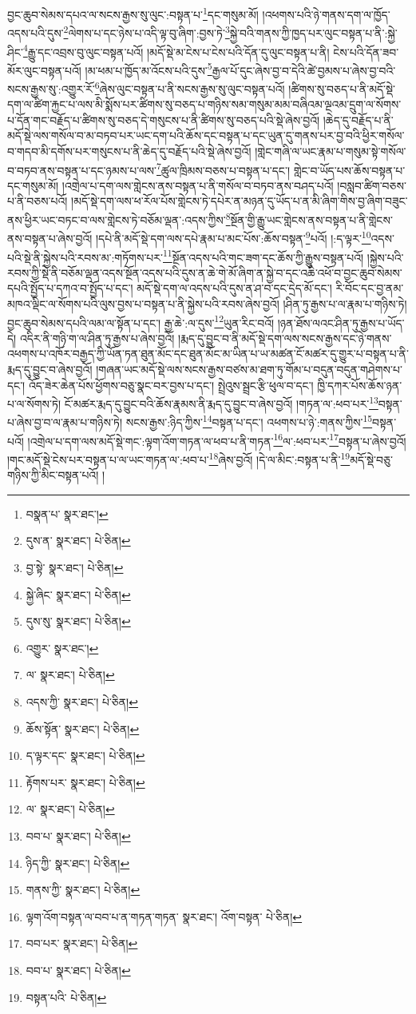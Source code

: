 བྱང་ཆུབ་སེམས་དཔའ་ལ་སངས་རྒྱས་སུ་ལུང་:བསྟན་པ་\footnote{བསྣན་པ་  སྣར་ཐང་། }དང་གསུམ་མོ། །འཕགས་པའི་ཉེ་གནས་དག་ལ་ཁྱོད་འདས་པའི་དུས་\footnote{དུས་ན་  སྣར་ཐང་།  པེ་ཅིན། }ལེགས་པ་དང་ཉེས་པ་འདི་ལྟ་བུ་ཞིག་:བྱས་ཏེ་\footnote{བྱ་སྟེ་  སྣར་ཐང་།  པེ་ཅིན། }སྐྱེ་བའི་གནས་ཀྱི་ཁྱད་པར་ལུང་བསྟན་པ་ནི་:སྐྱེ་ཤིང་\footnote{སྐྱེ་ཞིང་  སྣར་ཐང་།  པེ་ཅིན། }རྒྱུ་དང་འབྲས་བུ་ལུང་བསྟན་པའོ། །མདོ་སྡེ་མ་ངེས་པ་ངེས་པའི་དོན་དུ་ལུང་བསྟན་པ་ནི། ངེས་པའི་དོན་ཟབ་མོར་ལུང་བསྟན་པའོ། །མ་ཕམ་པ་ཁྱོད་མ་འོངས་པའི་དུས་\footnote{དུས་སུ་  སྣར་ཐང་།  པེ་ཅིན། }རྒྱལ་པོ་དུང་ཞེས་བྱ་བ་དེའི་ཚེ་བྱམས་པ་ཞེས་བྱ་བའི་སངས་རྒྱས་སུ་:འགྱུར་རོ་\footnote{འགྱུར་  སྣར་ཐང་། }ཞེས་ལུང་བསྟན་པ་ནི་སངས་རྒྱས་སུ་ལུང་བསྟན་པའོ། །ཚིགས་སུ་བཅད་པ་ནི་མདོ་སྡེ་དག་ལ་ཚིག་རྐྱང་པ་ལས་མི་སྨོས་པར་ཚིགས་སུ་བཅད་པ་གཉིས་སམ་གསུམ་མམ་བཞིའམ་ལྔའམ་དྲུག་ལ་སོགས་པ་དོན་གང་བརྗོད་པ་ཚིགས་སུ་བཅད་དེ་གསུངས་པ་ནི་ཚིགས་སུ་བཅད་པའི་སྡེ་ཞེས་བྱའོ། །ཆེད་དུ་བརྗོད་པ་ནི་མདོ་སྡེ་ལས་གསོལ་བ་མ་བཏབ་པར་ཡང་དག་པའི་ཆོས་དང་བསྟན་པ་དང་ཡུན་དུ་གནས་པར་བྱ་བའི་ཕྱིར་གསོལ་བ་གདབ་མི་དགོས་པར་གསུངས་པ་ནི་ཆེད་དུ་བརྗོད་པའི་སྡེ་ཞེས་བྱའོ། །གླེང་གཞི་ལ་ཡང་རྣམ་པ་གསུམ་སྟེ་གསོལ་བ་བཏབ་ནས་བསྟན་པ་དང་ཉམས་པ་ལས་\footnote{ལ་  སྣར་ཐང་།  པེ་ཅིན། }ཚུལ་ཁྲིམས་བཅས་པ་བསྟན་པ་དང་། གླེང་བ་ཡོད་པས་ཆོས་བསྟན་པ་དང་གསུམ་མོ། །འགྲེལ་པ་དག་ལས་གླེངས་ནས་བསྟན་པ་ནི་གསོལ་བ་བཏབ་ནས་བཤད་པའོ། །བསླབ་ཚིག་བཅས་པ་ནི་བཅས་པའོ། །མདོ་སྡེ་དག་ལས་ཕ་རོལ་པོས་གླེངས་ཏེ་དཔེར་ན་མཉན་དུ་ཡོད་པ་ན་མི་ཞིག་གིས་བྱ་ཞིག་བཟུང་ནས་ཕྱིར་ཡང་བཏང་བ་ལས་གླེངས་ཏེ་བཅོམ་ལྡན་:འདས་ཀྱིས་\footnote{འདས་ཀྱི་  སྣར་ཐང་།  པེ་ཅིན། }སྔོན་གྱི་རྒྱུ་ཡང་གླེངས་ནས་བསྟན་པ་ནི་གླེངས་ནས་བསྟན་པ་ཞེས་བྱའོ། །དཔེ་ནི་མདོ་སྡེ་དག་ལས་དཔེ་རྣམ་པ་མང་པོས་:ཆོས་བསྟན་\footnote{ཆོས་སྟོན་  སྣར་ཐང་།  པེ་ཅིན། }པའོ། །:ད་ལྟར་\footnote{ད་ལྟར་དང་  སྣར་ཐང་།  པེ་ཅིན། }འདས་པའི་སྡེ་ནི་སྐྱེས་པའི་རབས་མ་:གཏོགས་པར་\footnote{རྟོགས་པར་  སྣར་ཐང་།  པེ་ཅིན། }སྔོན་འདས་པའི་གང་ཟག་དང་ཆོས་ཀྱི་རྒྱུས་བསྟན་པའོ། །སྐྱེས་པའི་རབས་ཀྱི་སྡེ་ནི་བཅོམ་ལྡན་འདས་སྔོན་འདས་པའི་དུས་ན་ཆེ་གེ་མོ་ཞིག་ན་སྐྱེ་བ་དང་འཆི་འཕོ་བ་བྱང་ཆུབ་སེམས་དཔའི་སྤྱོད་པ་དཀའ་བ་སྤྱོད་པ་དང་། མདོ་སྡེ་དག་ལ་འདས་པའི་དུས་ན་ཤ་བ་དང་དྲེད་མོ་དང་། རི་བོང་དང་བྱ་ནམ་མཁའ་ལྡིང་ལ་སོགས་པའི་ལུས་བྱས་པ་བསྟན་པ་ནི་སྐྱེས་པའི་རབས་ཞེས་བྱའོ། །ཤིན་ཏུ་རྒྱས་པ་ལ་རྣམ་པ་གཉིས་ཏེ། བྱང་ཆུབ་སེམས་དཔའི་ལམ་ལ་སྟོན་པ་དང་། རྒྱ་ཆེ་:ལ་དུས་\footnote{ལ་  སྣར་ཐང་།  པེ་ཅིན། }ཡུན་རིང་བའོ། །ཉན་ཐོས་ལའང་ཤིན་ཏུ་རྒྱས་པ་ཡོད་དེ། འདིར་ནི་གཉི་ག་ལ་ཤིན་ཏུ་རྒྱས་པ་ཞེས་བྱའོ། །རྨད་དུ་བྱུང་བ་ནི་མདོ་སྡེ་དག་ལས་སངས་རྒྱས་དང་ཉེ་གནས་འཕགས་པ་འཁོར་བརྒྱད་ཀྱི་ཡོན་ཏན་ཐུན་མོང་དང་ཐུན་མོང་མ་ཡིན་པ་ཡ་མཚན་ངོ་མཚར་དུ་གྱུར་པ་བསྟན་པ་ནི་རྨད་དུ་བྱུང་བ་ཞེས་བྱའོ། །གཞན་ཡང་མདོ་སྡེ་ལས་སངས་རྒྱས་བཙས་མ་ཐག་ཏུ་གོམ་པ་བདུན་བདུན་གཤེགས་པ་དང་། འོད་ཟེར་ཆེན་པོས་ཕྱོགས་བཅུ་སྣང་བར་བྱས་པ་དང་། སྤྲེའུས་སྦྲང་རྩི་ཕུལ་བ་དང་། ཁྱི་དཀར་པོས་ཆོས་ཉན་པ་ལ་སོགས་ཏེ། ངོ་མཚར་རྨད་དུ་བྱུང་བའི་ཆོས་རྣམས་ནི་རྨད་དུ་བྱུང་བ་ཞེས་བྱའོ། །གཏན་ལ་:ཕབ་པར་\footnote{བབ་པ་  སྣར་ཐང་།  པེ་ཅིན། }བསྟན་པ་ཞེས་བྱ་བ་ལ་རྣམ་པ་གཉིས་ཏེ། སངས་རྒྱས་:ཉིད་ཀྱིས་\footnote{ཉིད་ཀྱི་  སྣར་ཐང་།  པེ་ཅིན། }བསྟན་པ་དང་། འཕགས་པ་ཉེ་:གནས་ཀྱིས་\footnote{གནས་ཀྱི་  སྣར་ཐང་།  པེ་ཅིན། }བསྟན་པའོ། །འགྲེལ་པ་དག་ལས་མདོ་སྡེ་གང་:ལྟག་འོག་གཏན་ལ་ཕབ་པ་ནི་གཏན་\footnote{ལྟག་འོག་བསྟན་ལ་བབ་པ་ན་གཏན་གཏན་  སྣར་ཐང་། འོག་བསྟན་  པེ་ཅིན། }ལ་:ཕབ་པར་\footnote{བབ་པར་  སྣར་ཐང་།  པེ་ཅིན། }བསྟན་པ་ཞེས་བྱའོ། །གང་མདོ་སྡེ་ངེས་པར་བསྟན་པ་ལ་ཡང་གཏན་ལ་:ཕབ་པ་\footnote{བབ་པ་  སྣར་ཐང་།  པེ་ཅིན། }ཞེས་བྱའོ། །དེ་ལ་མིང་:བསྟན་པ་ནི་\footnote{བསྟན་པའི་  པེ་ཅིན། }མདོ་སྡེ་བཅུ་གཉིས་ཀྱི་མིང་བསྟན་པའོ། །
